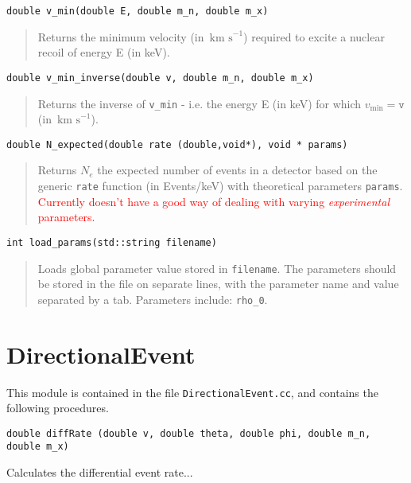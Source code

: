 \documentclass[a4paper]{article}
\newcommand{\kms}{\ensuremath{\,\textrm{km s}^{-1}}}
\begin{document}
\begin{lstlisting}
double v_min(double E, double m_n, double m_x)
\end{lstlisting}
\begin{quote}
Returns the minimum velocity (in \(\kms\)) required to excite a nuclear recoil of energy E (in keV).
\end{quote}

\begin{lstlisting}
double v_min_inverse(double v, double m_n, double m_x)
\end{lstlisting}

\begin{quote}
Returns the inverse of \texttt{v\_min} - i.e. the energy E (in keV) for which \(v_\textrm{min} = \texttt{v}\) (in \(\kms\)).
\end{quote}

\begin{lstlisting}
double N_expected(double rate (double,void*), void * params)
\end{lstlisting}

\begin{quote}
Returns \(N_e\) the expected number of events in a detector based on the generic \texttt{rate} function (in Events/keV) with theoretical parameters \texttt{params}. \textcolor{red}{Currently doesn't have a good way of dealing with varying \textit{experimental} parameters.}
\end{quote}

\begin{lstlisting}
int load_params(std::string filename)
\end{lstlisting}

\begin{quote}
Loads global parameter value stored in \texttt{filename}. The parameters should be stored in the file on separate lines, with the parameter name and value separated by a tab. Parameters include: \texttt{rho\_0}.
\end{quote}


\section{DirectionalEvent}

This module is contained in the file \texttt{DirectionalEvent.cc}, and contains the following procedures.


\begin{lstlisting}
double diffRate (double v, double theta, double phi, double m_n, double m_x)
\end{lstlisting}
Calculates the differential event rate...
\end{document}
